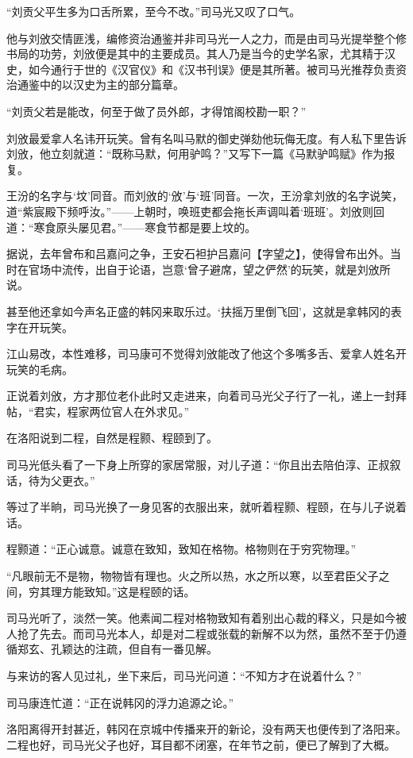 “刘贡父平生多为口舌所累，至今不改。”司马光又叹了口气。

他与刘攽交情匪浅，编修资治通鉴并非司马光一人之力，而是由司马光提举整个修书局的功劳，刘攽便是其中的主要成员。其人乃是当今的史学名家，尤其精于汉史，如今通行于世的《汉官仪》和《汉书刊误》便是其所著。被司马光推荐负责资治通鉴中的以汉史为主的部分篇章。

“刘贡父若是能改，何至于做了员外郎，才得馆阁校勘一职？”

刘攽最爱拿人名讳开玩笑。曾有名叫马默的御史弹劾他玩侮无度。有人私下里告诉刘攽，他立刻就道：“既称马默，何用驴鸣？”又写下一篇《马默驴鸣赋》作为报复。

王汾的名字与‘坟’同音。而刘攽的‘攽’与‘班’同音。一次，王汾拿刘攽的名字说笑，道“紫宸殿下频呼汝。”——上朝时，唤班吏都会拖长声调叫着‘班班’。刘攽则回道：“寒食原头屡见君。”——寒食节都是要上坟的。

据说，去年曾布和吕嘉问之争，王安石袒护吕嘉问【字望之】，使得曾布出外。当时在官场中流传，出自于论语，岂意‘曾子避席，望之俨然’的玩笑，就是刘攽所说。

甚至他还拿如今声名正盛的韩冈来取乐过。‘扶摇万里倒飞回’，这就是拿韩冈的表字在开玩笑。

江山易改，本性难移，司马康可不觉得刘攽能改了他这个多嘴多舌、爱拿人姓名开玩笑的毛病。

正说着刘攽，方才那位老仆此时又走进来，向着司马光父子行了一礼，递上一封拜帖，“君实，程家两位官人在外求见。”

在洛阳说到二程，自然是程颢、程颐到了。

司马光低头看了一下身上所穿的家居常服，对儿子道：“你且出去陪伯淳、正叔叙话，待为父更衣。”

等过了半晌，司马光换了一身见客的衣服出来，就听着程颢、程颐，在与儿子说着话。

程颢道：“正心诚意。诚意在致知，致知在格物。格物则在于穷究物理。”

“凡眼前无不是物，物物皆有理也。火之所以热，水之所以寒，以至君臣父子之间，穷其理方能致知。”这是程颐的话。

司马光听了，淡然一笑。他素闻二程对格物致知有着别出心裁的释义，只是如今被人抢了先去。而司马光本人，却是对二程或张载的新解不以为然，虽然不至于仍遵循郑玄、孔颖达的注疏，但自有一番见解。

与来访的客人见过礼，坐下来后，司马光问道：“不知方才在说着什么？”

司马康连忙道：“正在说韩冈的浮力追源之论。”

洛阳离得开封甚近，韩冈在京城中传播来开的新论，没有两天也便传到了洛阳来。二程也好，司马光父子也好，耳目都不闭塞，在年节之前，便已了解到了大概。

